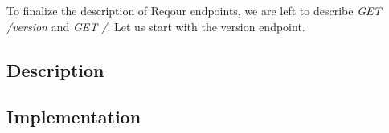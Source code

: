 \documentclass[../main.tex]{subfiles}
\begin{document}
To finalize the description of Reqour endpoints, we are left to describe \textit{GET /version} and \textit{GET /}. Let us start with the version endpoint.

\subsection{Description}


\subsection{Implementation}

\end{document}
